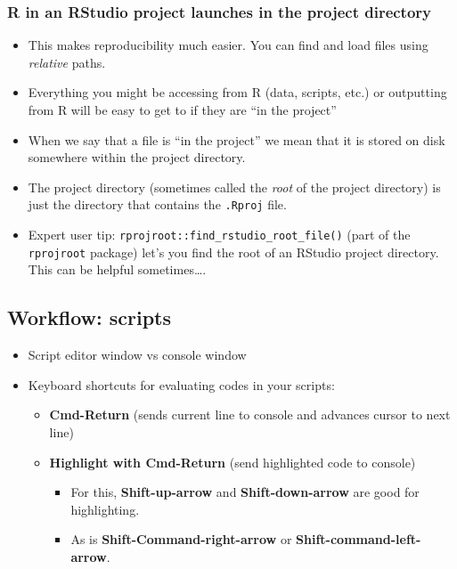 \documentclass[]{book}
\providecommand{\tightlist}{%
  \setlength{\itemsep}{0pt}\setlength{\parskip}{0pt}}
\theoremstyle{definition}
\theoremstyle{definition}
\theoremstyle{remark}
\begin{document}
\subsubsection{R in an RStudio project launches in the project
directory}\label{r-in-an-rstudio-project-launches-in-the-project-directory}

\begin{itemize}
\tightlist
\item
  This makes reproducibility much easier. You can find and load files
  using \emph{relative} paths.\\
\item
  Everything you might be accessing from R (data, scripts, etc.) or
  outputting from R will be easy to get to if they are ``in the
  project''
\item
  When we say that a file is ``in the project'' we mean that it is
  stored on disk somewhere within the project directory.
\item
  The project directory (sometimes called the \emph{root} of the project
  directory) is just the directory that contains the \texttt{.Rproj}
  file.
\item
  Expert user tip: \texttt{rprojroot::find\_rstudio\_root\_file()} (part
  of the \texttt{rprojroot} package) let's you find the root of an
  RStudio project directory. This can be helpful sometimes\ldots{}.
\end{itemize}

\subsection{Workflow: scripts}\label{workflow-scripts}

\begin{itemize}
\tightlist
\item
  Script editor window vs console window
\item
  Keyboard shortcuts for evaluating codes in your scripts:

  \begin{itemize}
  \tightlist
  \item
    \textbf{Cmd-Return} (sends current line to console and advances
    cursor to next line)
  \item
    \textbf{Highlight with Cmd-Return} (send highlighted code to
    console)

    \begin{itemize}
    \tightlist
    \item
      For this, \textbf{Shift-up-arrow} and \textbf{Shift-down-arrow}
      are good for highlighting.
    \item
      As is \textbf{Shift-Command-right-arrow} or
      \textbf{Shift-command-left-arrow}.
    \end{itemize}
  \end{itemize}
\end{itemize}
\end{document}
